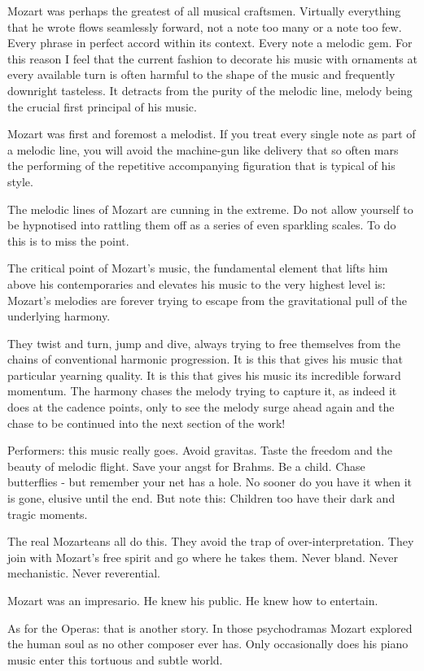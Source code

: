 \documentclass{article}
\begin{document}
Mozart was perhaps the greatest of all musical craftsmen.
Virtually everything that he wrote flows seamlessly forward, not a note too many or a note too few.
Every phrase in perfect accord within its context.
Every note a melodic gem.
For this reason I feel that the current fashion to decorate his music with ornaments at every available turn is often harmful to the shape of the music and frequently downright tasteless.
It detracts from the purity of the melodic line, melody being the crucial first principal of his music.

Mozart was first and foremost a melodist.
If you treat every single note as part of a melodic line, you will avoid the machine-gun like delivery that so often mars the performing of the repetitive accompanying figuration that is typical of his style.

The melodic lines of Mozart are cunning in the extreme.
Do not allow yourself to be hypnotised into rattling them off as a series of even sparkling scales.
To do this is to miss the point.

The critical point of Mozart's music, the fundamental element that lifts him above his contemporaries and elevates his music to the very highest level is: Mozart's melodies are forever trying to escape from the gravitational pull of the underlying harmony.

They twist and turn, jump and dive, always trying to free themselves from the chains of conventional harmonic progression.
It is this that gives his music that particular yearning quality.
It is this that gives his music its incredible forward momentum.
The harmony chases the melody trying to capture it, as indeed it does at the cadence points, only to see the melody surge ahead again and the chase to be continued into the next section of the work!

Performers: this music really goes.
Avoid gravitas.
Taste the freedom and the beauty of melodic flight.
Save your angst for Brahms.
Be a child.
Chase butterflies - but remember your net has a hole.
No sooner do you have it when it is gone, elusive until the end.
But note this: Children too have their dark and tragic moments.

The real Mozarteans all do this.
They avoid the trap of over-interpretation.
They join with Mozart's free spirit and go where he takes them.
Never bland.
Never mechanistic.
Never reverential.

Mozart was an impresario.
He knew his public.
He knew how to entertain.

As for the Operas: that is another story.
In those psychodramas Mozart explored the human soul as no other composer ever has.
Only occasionally does his piano music enter this tortuous and subtle world.
\end{document}
